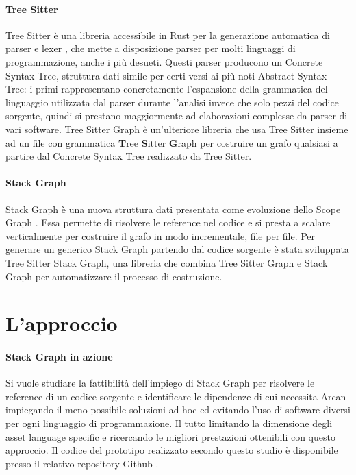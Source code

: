 \paragraph{Tree Sitter}

Tree Sitter \cite{TreeSitter} \`e una libreria accessibile in Rust per la generazione automatica di parser e lexer \cite{sestoft2017programming}, che mette a disposizione parser per molti linguaggi di programmazione, anche i pi\`u desueti. Questi parser producono un Concrete Syntax Tree, struttura dati simile per certi versi ai pi\`u noti Abstract Syntax Tree: i primi rappresentano concretamente l'espansione della grammatica del linguaggio utilizzata dal parser durante l'analisi invece che solo pezzi del codice sorgente, quindi si prestano maggiormente ad elaborazioni complesse da parser di vari software. Tree Sitter Graph \`e un'ulteriore libreria che usa Tree Sitter insieme ad un file con grammatica \textbf{T}ree \textbf{S}itter \textbf{G}raph per costruire un grafo qualsiasi a partire dal Concrete Syntax Tree realizzato da Tree Sitter.

\paragraph{Stack Graph}

Stack Graph \cite{StackGraph} \`e una nuova struttura dati presentata \cite{StackGraphNameResolutionAtScale} come evoluzione dello Scope Graph \cite{ScopeGraph}. Essa permette di risolvere le reference nel codice e si presta a scalare verticalmente per costruire il grafo in modo incrementale, file per file. Per generare un generico Stack Graph partendo dal codice sorgente \`e stata sviluppata Tree Sitter Stack Graph, una libreria che combina Tree Sitter Graph e Stack Graph per automatizzare il processo di costruzione.

\section{L'approccio}

\paragraph{Stack Graph in azione}

Si vuole studiare la fattibilit\`a dell'impiego di Stack Graph per risolvere le reference di un codice sorgente e identificare le dipendenze di cui necessita Arcan impiegando il meno possibile soluzioni ad hoc ed evitando l'uso di software diversi per ogni linguaggio di programmazione. Il tutto limitando la dimensione degli asset language specific e ricercando le migliori prestazioni ottenibili con questo approccio. Il codice del prototipo realizzato secondo questo studio \`e disponibile presso il relativo repository Github \cite{SkullianRepository}.

